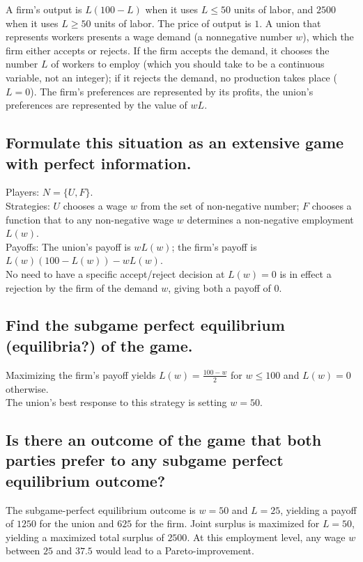 \documentclass{article}
\begin{document}
A firm's output is $L(100-L)$ when it uses $L \leq 50$ units of labor, and $2500$ when it uses
$L \geq 50$ units of labor. The price of output is $1$. A union that represents workers
presents a wage demand (a nonnegative number $w$), which the firm either accepts or rejects. If
the firm accepts the demand, it chooses the number $L$ of workers to employ (which you should
take to be a continuous variable, not an integer); if it rejects the demand, no production
takes place ($L = 0$). The firm's preferences are represented by its profits, the union's
preferences are represented by  the value of $wL$.

\subsection{Formulate this situation as an extensive game with perfect information. }

Players: $N = \{U, F \}$. \\ Strategies: $U$ chooses a wage $w$ from the set of non-negative number; $F$ chooses a function that to any non-negative wage $w$ determines a non-negative employment $L(w)$. \\ Payoffs: The union's payoff is $wL(w)$; the firm's payoff is $L(w)(100-L(w)) - wL(w)$. \\ No need to have a specific accept/reject decision at $L(w) = 0$ is in effect a rejection by the firm of the demand $w$, giving both a payoff of $0$.
%
\subsection{Find the subgame perfect equilibrium (equilibria?) of the game.}

Maximizing the firm's payoff yields $L(w) = \tfrac{100-w}2$ for $w \leq 100$ and $L(w) = 0$ otherwise. \\ The union's best response to this strategy is setting $w=50$. 
%
\subsection{Is there an outcome of the game that both parties prefer to any subgame perfect
equilibrium outcome? }

The subgame-perfect equilibrium outcome is $w=50$ and $L=25$, yielding a payoff of $1250$ for the union and $625$ for the firm. Joint surplus is maximized for $L = 50$, yielding a maximized total surplus of $2500$. At this employment level, any wage $w$ between $25$ and $37.5$ would lead to a Pareto-improvement. 
%
\end{document}
